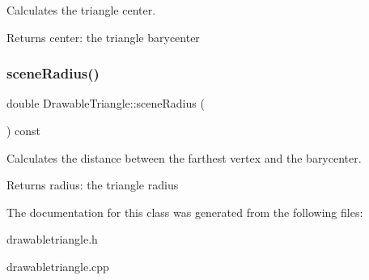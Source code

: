 Calculates the triangle center. 

\begin{DoxyReturn}{Returns}
center\+: the triangle barycenter 
\end{DoxyReturn}
\mbox{\label{classDrawableTriangle_a2eed49d841204c4925ef7fcadba4e8f4}} 
\subsubsection{\texorpdfstring{scene\+Radius()}{sceneRadius()}}
{\footnotesize\ttfamily double Drawable\+Triangle\+::scene\+Radius (\begin{DoxyParamCaption}{ }\end{DoxyParamCaption}) const}



Calculates the distance between the farthest vertex and the barycenter. 

\begin{DoxyReturn}{Returns}
radius\+: the triangle radius 
\end{DoxyReturn}


The documentation for this class was generated from the following files\+:\begin{DoxyCompactItemize}
\item 
drawabletriangle.\+h\item 
drawabletriangle.\+cpp\end{DoxyCompactItemize}
